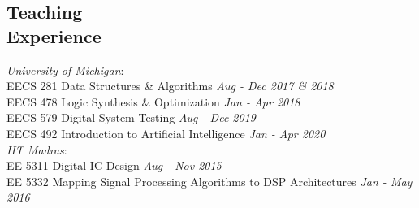 \documentclass[margin,line,letter]{resume}
\begin{document}
\begin{resume}

\section{\mysidestyle Teaching\\Experience}
    \textit{University of Michigan}: \\
    \phantom{xx}\hspace{3ex} EECS 281 Data Structures \& Algorithms \hfill \emph{Aug - Dec 2017 \& 2018} \\
    \phantom{xx}\hspace{3ex} EECS 478 Logic Synthesis \& Optimization \hfill \emph{Jan - Apr 2018} \\
    \phantom{xx}\hspace{3ex} EECS 579 Digital System Testing \hfill \emph{Aug - Dec 2019} \\
    \phantom{xx}\hspace{3ex} EECS 492 Introduction to Artificial Intelligence \hfill \emph{Jan - Apr 2020} \\
    \textit{IIT Madras}: \\
    \phantom{xx}\hspace{3ex} EE 5311 Digital IC Design \hfill \emph{Aug - Nov 2015} \\
    \phantom{xx}\hspace{3ex} EE 5332 Mapping Signal Processing Algorithms to DSP Architectures \hfill \emph{Jan - May 2016}

    

\end{resume}
\end{document}
